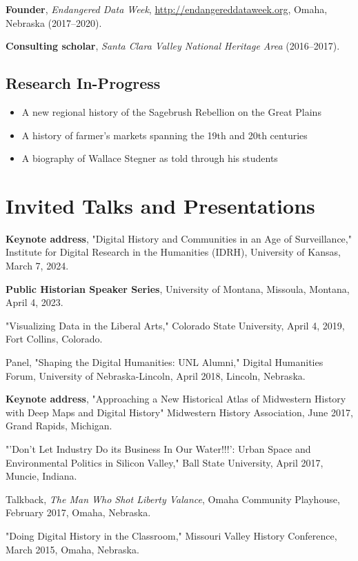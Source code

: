 \documentclass[10pt]{article}
\begin{document}
\textbf{Founder}, \textit{Endangered Data Week}, \url{http://endangereddataweek.org}, Omaha, Nebraska (2017--2020).

\textbf{Consulting scholar}, \textit{Santa Clara Valley National Heritage Area} (2016--2017).

\subsection*{Research In-Progress}\label{in-progress}

\begin{itemize}
\item A new regional history of the Sagebrush Rebellion on the Great Plains
\item A history of farmer's markets spanning the 19th and 20th centuries
\item A biography of Wallace Stegner as told through his students
\end{itemize}

\section{Invited Talks and Presentations}

\textbf{Keynote address}, "Digital History and Communities in an Age of Surveillance," Institute for Digital Research in the Humanities (IDRH), University of Kansas, March 7, 2024.

\textbf{Public Historian Speaker Series}, University of Montana, Missoula, Montana, April 4, 2023.

"Visualizing Data in the Liberal Arts," Colorado State University, April 4, 2019, Fort Collins, Colorado.

Panel, "Shaping the Digital Humanities: UNL Alumni," Digital Humanities Forum, University of Nebraska-Lincoln, April 2018, Lincoln, Nebraska.

\textbf{Keynote address}, "Approaching a New Historical Atlas of Midwestern History with Deep Maps and Digital History" Midwestern History Association, June 2017, Grand Rapids, Michigan.

"'Don't Let Industry Do its Business In Our Water!!!': Urban Space and Environmental Politics in Silicon Valley," Ball State University, April 2017, Muncie, Indiana.

Talkback, \textit{The Man Who Shot Liberty Valance}, Omaha Community Playhouse, February 2017, Omaha, Nebraska.

"Doing Digital History in the Classroom," Missouri Valley History Conference, March 2015, Omaha, Nebraska.
\end{document}
